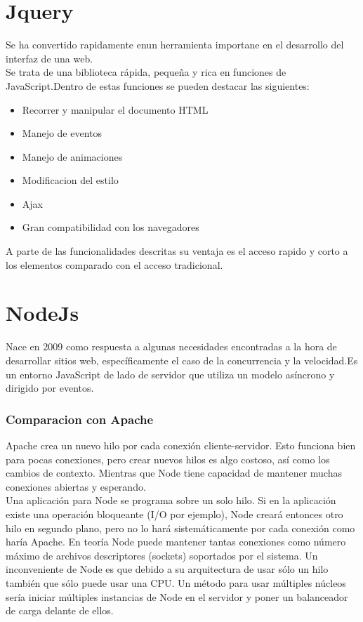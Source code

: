 \section{Jquery}
Se ha convertido rapidamente enun herramienta importane en el desarrollo del interfaz de una web. 
\\Se trata de una biblioteca rápida, pequeña y rica en funciones de JavaScript.Dentro de estas funciones se pueden destacar las siguientes:
\begin{itemize}
\item Recorrer y manipular el documento HTML
\item Manejo de eventos
\item Manejo de animaciones
\item Modificacion del estilo 
\item Ajax
\item Gran compatibilidad con los navegadores
\end{itemize}
 A parte de las funcionalidades descritas su ventaja es el acceso rapido y corto a los elementos comparado con el acceso tradicional.
\section{NodeJs}
Nace en 2009 como respuesta a algunas necesidades encontradas a la hora de desarrollar sitios web, específicamente el caso de la concurrencia y la velocidad.Es un entorno JavaScript de lado de servidor que utiliza un modelo asíncrono y dirigido por eventos.
\subsubsection{Comparacion con Apache}
Apache crea un nuevo hilo por cada conexión cliente-servidor. Esto funciona bien para pocas conexiones, pero crear nuevos hilos es algo costoso, así como los cambios de contexto. Mientras que Node tiene  capacidad de mantener muchas conexiones abiertas y esperando.
\\Una aplicación para Node se programa sobre un solo hilo. Si en la aplicación existe una operación bloqueante (I/O por ejemplo), Node creará entonces otro hilo en segundo plano, pero no lo hará sistemáticamente por cada conexión como haría Apache. En teoría Node puede mantener tantas conexiones como número máximo de archivos descriptores (sockets) soportados por el sistema. Un inconveniente de Node es que debido a su arquitectura de usar sólo un hilo también que sólo puede usar una CPU. Un método para usar múltiples núcleos sería iniciar múltiples instancias de Node en el servidor y poner un balanceador de carga delante de ellos.
